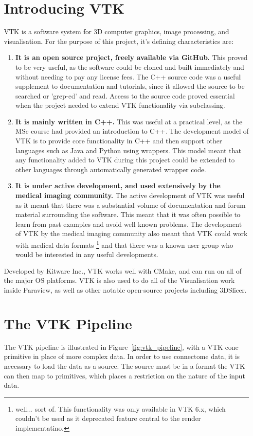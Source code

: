 \documentclass[MSc,paper=a4,pagesize=auto]{icldt}
\begin{document}
\section{Introducing VTK}
VTK is a software system for 3D computer graphics, image processing, and visualisation. For the purpose of this project, it's defining characteristics are:
\begin{enumerate}
\item \textbf{It is an open source project, freely available via GitHub.} This proved to be very useful, as the software could be cloned and built immediately and without needing to pay any license fees. The C++ source code was a useful supplement to documentation and tutorials, since it allowed the source to be searched or 'grep-ed' and read. Access to the source code proved essential when the project needed to extend VTK functionality via subclassing. 
\item \textbf{It is mainly written in C++.} This was useful at a practical level, as the MSc course had provided an introduction to C++. The development model of VTK is to provide core functionality in C++ and then support other languages such as Java and Python using wrappers. This model meant that any functionality added to VTK during this project could be extended to other languages through automatically generated wrapper code.
\item \textbf{It is under active development, and used extensively by the medical imaging community.} The active development of VTK was useful as it meant that there was a substantial volume of documentation and forum material surrounding the software. This meant that it was often possible to learn from past examples and avoid well known problems. The development of VTK by the medical imaging community also meant that VTK could work with medical data formats \footnote{well... sort of. This functionality was only available in VTK 6.x, which couldn't be used as it deprecated feature central to the render implementatino.} and that there was a known user group who would be interested in any useful developments.
\end{enumerate}

Developed by Kitware Inc., VTK works well with CMake, and can run on all of the major OS platforms. VTK is also used to do all of the Visualisation work inside Paraview, as well as other notable open-source projects including 3DSlicer.

\section{The VTK Pipeline}
The VTK pipeline is illustrated in Figure~\ref{fig:vtk_pipeline}, with a VTK cone primitive in place of more complex data. In order to use connectome data, it is necessary to load the data as a source. The source must be in a format the VTK can then map to primitives, which places a restriction on the nature of the input data.
\end{document}
